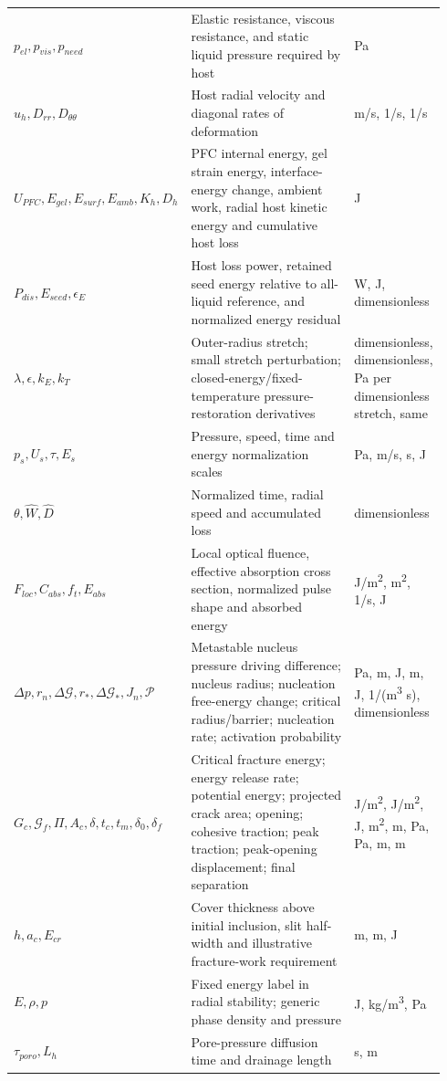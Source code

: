 \documentclass[10pt,a4paper]{article}
\begin{document}
\begin{longtable}{>{\raggedright\arraybackslash}p{0.31\linewidth}>{\raggedright\arraybackslash}p{0.45\linewidth}>{\raggedright\arraybackslash}p{0.18\linewidth}}
$p_{el},p_{vis},p_{need}$ & Elastic resistance, viscous resistance, and static liquid pressure required by host & Pa\\[4pt]
$u_h,D_{rr},D_{\theta\theta}$ & Host radial velocity and diagonal rates of deformation & m/s, 1/s, 1/s\\[4pt]
$U_{PFC},E_{gel},E_{surf},E_{amb},K_h,D_h$ & PFC internal energy, gel strain energy, interface-energy change, ambient work, radial host kinetic energy and cumulative host loss & J\\[4pt]
$P_{dis},E_{seed},\epsilon_E$ & Host loss power, retained seed energy relative to all-liquid reference, and normalized energy residual & W, J, dimensionless\\[4pt]
$\lambda,\epsilon,k_E,k_T$ & Outer-radius stretch; small stretch perturbation; closed-energy/fixed-temperature pressure-restoration derivatives & dimensionless, dimensionless, Pa per dimensionless stretch, same\\[4pt]
$p_s,U_s,\tau,E_s$ & Pressure, speed, time and energy normalization scales & Pa, m/s, s, J\\[4pt]
$\theta,\widehat W,\widehat D$ & Normalized time, radial speed and accumulated loss & dimensionless\\[4pt]
$F_{loc},C_{abs},f_t,E_{abs}$ & Local optical fluence, effective absorption cross section, normalized pulse shape and absorbed energy & J/m\textsuperscript{2}, m\textsuperscript{2}, 1/s, J\\[4pt]
$\Delta p,r_n,\Delta\mathcal G,r_*,\Delta\mathcal G_*,J_n,\mathcal P$ & Metastable nucleus pressure driving difference; nucleus radius; nucleation free-energy change; critical radius/barrier; nucleation rate; activation probability & Pa, m, J, m, J, 1/(m\textsuperscript{3} s), dimensionless\\[4pt]
$G_c,\mathcal G_f,\Pi,A_c,\delta,t_c,t_m,\delta_0,\delta_f$ & Critical fracture energy; energy release rate; potential energy; projected crack area; opening; cohesive traction; peak traction; peak-opening displacement; final separation & J/m\textsuperscript{2}, J/m\textsuperscript{2}, J, m\textsuperscript{2}, m, Pa, Pa, m, m\\[4pt]
$h,a_c,E_{cr}$ & Cover thickness above initial inclusion, slit half-width and illustrative fracture-work requirement & m, m, J\\[4pt]
$E,\rho,p$ & Fixed energy label in radial stability; generic phase density and pressure & J, kg/m\textsuperscript{3}, Pa\\[4pt]
$\tau_{poro},L_h$ & Pore-pressure diffusion time and drainage length & s, m\\[4pt]

\end{longtable}
\end{document}
